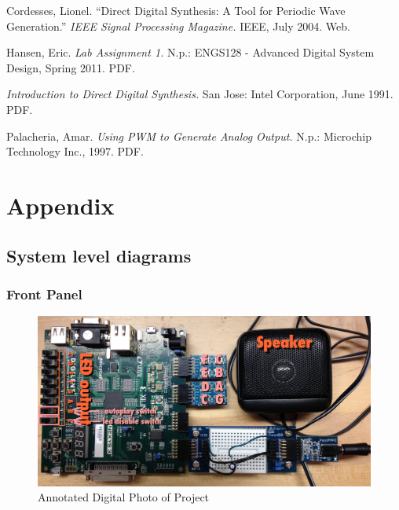 \documentclass{article}
\begin{document}
  \begin{thebibliography}{9}

  	Cordesses, Lionel.
  	``Direct Digital Synthesis: A Tool for Periodic Wave Generation.''
  	\emph{IEEE Signal Processing Magazine.}
  	IEEE,
  	July 2004. 
  	Web.  	

  	Hansen, Eric.
  	\emph{Lab Assignment 1.}
  	N.p.:
  	ENGS128 - Advanced Digital System Design, Spring 2011.
  	PDF.

  	\emph{Introduction to Direct Digital Synthesis.}
  	San Jose: Intel Corporation,
  	June 1991.
  	PDF.

  	Palacheria, Amar.
  	\emph{Using PWM to Generate Analog Output.}
  	N.p.: Microchip Technology Inc.,
  	1997.
  	PDF.

  \end{thebibliography}

\newpage
\section{Appendix}
  	\listoffigures
  	\listoftables

  	\newpage
  	\subsection{System level diagrams}

    \subsubsection{Front Panel}
      

	    \begin{figure}[H]
	    	\centering
	    	\includegraphics[width=6.5in]{img/annotated.jpg}
	    	\caption{Annotated Digital Photo of Project}
	    \end{figure}
\end{document}
